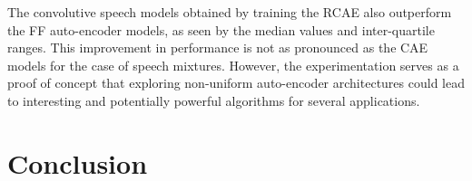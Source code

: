 \documentclass{article}
\begin{document}
The convolutive speech models obtained by training the RCAE also outperform the FF auto-encoder models, as seen by the median values and inter-quartile ranges. This improvement in performance is not as pronounced as the CAE models for the case of speech mixtures. However, the experimentation serves as a proof of concept that exploring non-uniform auto-encoder architectures could lead to interesting and potentially powerful algorithms for several applications.  

\section{Conclusion}
\label{sec:conclusion}




\end{document}
